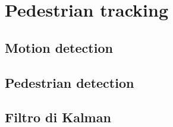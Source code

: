 \chapter{Pedestrian tracking}


\section{Motion detection}

\section{Pedestrian detection}

\section{Filtro di Kalman}

